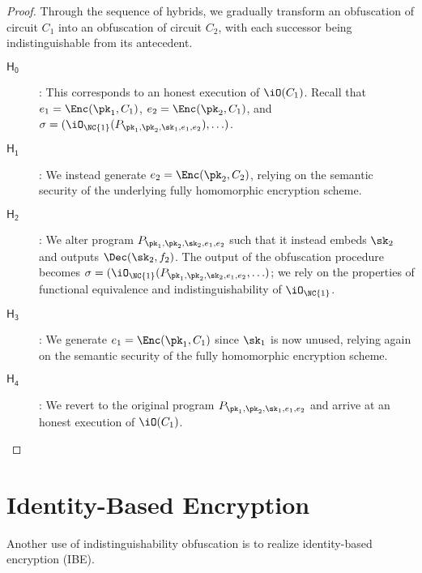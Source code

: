 \newcommand{\Hyb}[1]{\ensuremath{\mathsf{H_{#1}}}}
\begin{proof}
Through the sequence of hybrids, we gradually transform an obfuscation
of circuit $C_1$ into an obfuscation of circuit $C_2$, with each
successor being indistinguishable from its antecedent.
\begin{description}
\item[$\Hyb{0}$]:
	This corresponds to an honest execution of $\iO(C_1)$.
	Recall that $e_1 = \Enc(\pk_1, C_1)$, $e_2 = \Enc(\pk_2, C_1)$,
	and $\sigma = (\iO_{\NC{1}}(\prog{1}), \ldots)$.

\item[$\Hyb{1}$]:
	We instead generate $e_2 = \Enc(\pk_2, C_2)$, relying on the
	semantic security of the underlying fully homomorphic encryption
	scheme.

\item[$\Hyb{2}$]:
	We alter program $\prog{2}$ such that it instead embeds $\sk_2$
	and outputs $\Dec(\sk_2, f_2)$.
	The output of the obfuscation procedure becomes
	$\sigma = (\iO_{\NC{1}}(\prog{2}, \ldots)$;
	we rely on the properties of functional equivalence and
	indistinguishability of $\iO_{\NC{1}}$.

\item[$\Hyb{3}$]:
	We generate $e_1 = \Enc(\pk_1, C_1)$ since $\sk_1$ is now
	unused, relying again on the semantic security of the fully
	homomorphic encryption scheme.

\item[$\Hyb{4}$]:
	We revert to the original program $\prog{1}$ and arrive
	at an honest execution of $\iO(C_1)$.

\end{description}
\end{proof}


\section{Identity-Based Encryption}

Another use of indistinguishability obfuscation is to realize
identity-based encryption (IBE).


